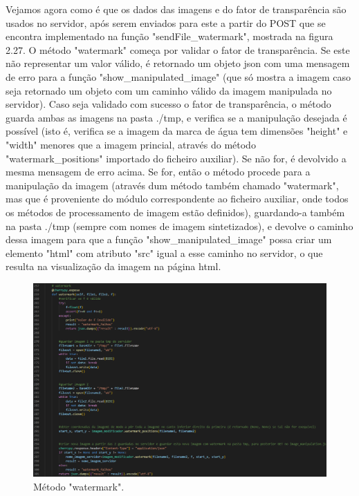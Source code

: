 \documentclass{report}
\begin{document}
     \linebreak
 \bigskip

 Vejamos agora como é que os dados das imagens e do fator de transparência são usados no servidor, após serem enviados para este a partir do POST que se encontra implementado na função "sendFile\_watermark", mostrada na figura 2.27.
\linebreak
 \bigskip
 O método "watermark" começa por validar o fator de transparência. Se este não representar um valor válido, é retornado um objeto json com uma mensagem de erro para a função "show\_manipulated\_image" (que só mostra a imagem caso seja retornado um objeto com um caminho válido da imagem manipulada no servidor).
 \linebreak
 \bigskip
 Caso seja validado com sucesso o fator de transparência, o método guarda ambas as imagens na pasta ./tmp, e verifica se a manipulação desejada é possível (isto é, verifica se a imagem da marca de água tem dimensões "height" e "width" menores que a imagem princial, através do método "watermark\_positions" importado do ficheiro auxiliar). Se não for, é devolvido a mesma mensagem de erro acima. Se for, então o método procede para a manipulação da imagem (através dum método também chamado "watermark", mas que é proveniente do módulo correspondente ao ficheiro auxiliar, onde todos os métodos de processamento de imagem estão definidos), guardando-a também na pasta ./tmp (sempre com nomes de imagem sintetizados), e devolve o caminho dessa imagem para que a função "show\_manipulated\_image" possa criar um elemento "html" com atributo "src" igual a esse caminho no servidor, o que resulta na visualização da imagem na página html.


\begin{figure}[!hbtp]
        \centering
        \includegraphics[scale=0.42]{Images_code/12 - image manipulation app watermark.png}
        \caption{\label{Estrutura}Método "watermark".}
\end{figure}
\end{document}
